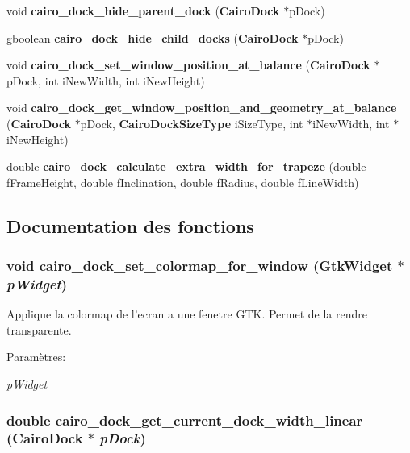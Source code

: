\begin{CompactItemize}
\item 
void {\bf cairo\_\-dock\_\-hide\_\-parent\_\-dock} ({\bf CairoDock} $\ast$pDock)
\item 
gboolean {\bf cairo\_\-dock\_\-hide\_\-child\_\-docks} ({\bf CairoDock} $\ast$pDock)
\item 
void {\bf cairo\_\-dock\_\-set\_\-window\_\-position\_\-at\_\-balance} ({\bf CairoDock} $\ast$pDock, int iNewWidth, int iNewHeight)
\item 
void {\bf cairo\_\-dock\_\-get\_\-window\_\-position\_\-and\_\-geometry\_\-at\_\-balance} ({\bf CairoDock} $\ast$pDock, {\bf CairoDockSizeType} iSizeType, int $\ast$iNewWidth, int $\ast$iNewHeight)
\item 
double {\bf cairo\_\-dock\_\-calculate\_\-extra\_\-width\_\-for\_\-trapeze} (double fFrameHeight, double fInclination, double fRadius, double fLineWidth)
\end{CompactItemize}


\subsection{Documentation des fonctions}
\subsubsection{\setlength{\rightskip}{0pt plus 5cm}void cairo\_\-dock\_\-set\_\-colormap\_\-for\_\-window (GtkWidget $\ast$ {\em pWidget})}\label{cairo-dock-draw_8h_3c7e37f5ffc3482f9487f4dbc9491b93}


Applique la colormap de l'ecran a une fenetre GTK. Permet de la rendre transparente. \begin{Desc}
\item[Paramètres:]
\begin{description}
\item[{\em pWidget}]\end{description}
\end{Desc}
\subsubsection{\setlength{\rightskip}{0pt plus 5cm}double cairo\_\-dock\_\-get\_\-current\_\-dock\_\-width\_\-linear ({\bf CairoDock} $\ast$ {\em pDock})}\label{cairo-dock-draw_8h_ea372b03ccfb1e8a769c817f9b750f37}


